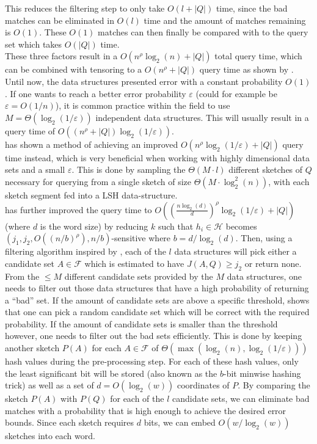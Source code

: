 This reduces the filtering step to only take $O(l + |Q|)$ time, since the bad matches can be eliminated in $O(l)$ time and the amount of matches remaining is $O(1)$. These $O(1)$ matches can then finally be compared with to the query set which takes $O(|Q|)$ time.\\
These three factors result in a $O(n^\rho \log_2(n) + |Q|)$ total query time, which can be combined with tensoring to a $O(n^\rho + |Q|)$ query time as shown by \citet{christiani2018fast}.\\
Until now, the data structures presented error with a constant probability $O(1)$. If one wants to reach a better error probability $\varepsilon$ (could for example be $\varepsilon = O(1/n)$), it is common practice within the field to use $M=\Theta(\log_2(1/\varepsilon))$ independent data structures. This will usually result in a query time of $O((n^\rho + |Q|)\log_2(1/\varepsilon))$. \\
\citet{fast-similarity-search} has shown a method of achieving an improved $O(n^\rho \log_2(1/\varepsilon)+|Q|)$ query time instead, which is very beneficial when working with highly dimensional data sets and a small $\varepsilon$. This is done by sampling the $\Theta(M\cdot l)$ different sketches of $Q$ necessary for querying from a single sketch of size $\Theta(M\cdot \log^2_2(n))$, with each sketch segment fed into a LSH data-structure. \\
\citet{fast-similarity-search} has further improved the query time to $O((\frac{n\log_2(d)}{d})^{\rho}\log_2(1/\varepsilon)+|Q|)$ (where $d$ is the word size) by reducing $k$ such that $h_i\in \mathcal{H}$ becomes $(j_1, j_2, O((n/b)^\rho), n/b)$-sensitive where $b=d/\log_2(d)$. Then, using a filtering algorithm inspired by \cite{fast-similarity-search}, each of the $l$ data structures will pick either a candidate set $A\in \mathcal{F}$ which is estimated to have $J(A,Q) \geq j_2$ or return none. \\
From the $\leq M$ different candidate sets provided by the $M$ data structures, one needs to filter out those data structures that have a high probability of returning a ``bad'' set.
If the amount of candidate sets are above a specific threshold, \citet{fast-similarity-search} shows that one can pick a random candidate set which will be correct with the required probability. If the amount of candidate sets is smaller than the threshold however, one needs to filter out the bad sets efficiently. 
This is done by keeping another sketch $P(A)$ for each $A\in \mathcal{F}$ of $\Theta(\max(\log_2(n), \log_2(1/\varepsilon)))$ hash values during the pre-processing step. For each of these hash values, only the least significant bit will be stored (also known as the $b$-bit minwise hashing trick\cite{li2011hashing}) as well as a set of $d=O(\log_2(w))$ coordinates of $P$. By comparing the sketch $P(A)$ with $P(Q)$ for each of the $l$ candidate sets, we can eliminate bad matches with a probability that is high enough to achieve the desired error bounds. Since each sketch requires $d$ bits, we can embed $O(w/\log_2(w))$ sketches into each word.
